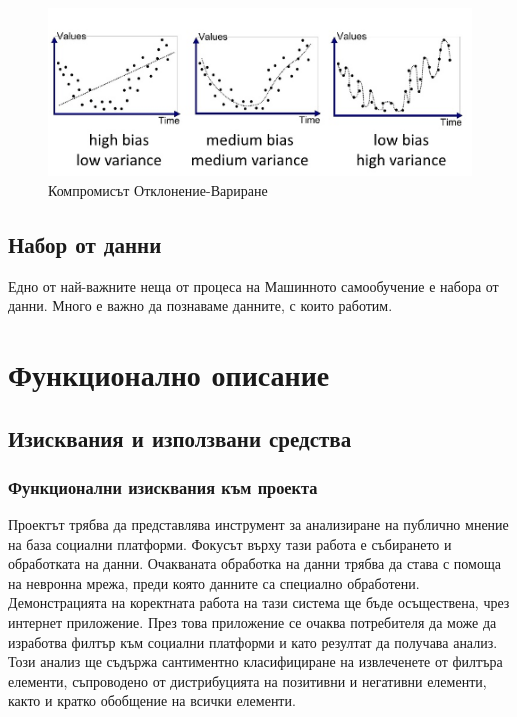 \documentclass{article}
\begin{document}
    \begin{figure}[H]
        \centering
        \captionsetup{justification=centering}
        \includegraphics[width=450px, keepaspectratio]{chapter-03/bias-variance.png}
        \caption{Компромисът Отклонение-Вариране}
    \end{figure}

    \subsection{Набор от данни}

    Едно от най-важните неща от процеса на Машинното самообучение е набора от данни. Много е важно да познаваме данните, с
    които работим. \cite{intro-to-ml}

    \newpage


    \section{Функционално описание}

    \subsection{Изисквания и използвани средства}

    \subsubsection{Функционални изисквания към проекта}

    Проектът трябва да представлява инструмент за анализиране на публично мнение на база социални платформи. Фокусът върху
    тази работа е събирането и обработката на данни. Очакваната обработка на данни трябва да става с помоща на невронна
    мрежа, преди която данните са специално обработени. Демонстрацията на коректната работа на тази система ще бъде
    осъществена, чрез интернет приложение. През това приложение се очаква потребителя да може да изработва филтър към
    социални платформи и като резултат да получава анализ. Този анализ ще съдържа сантиментно класифициране на извлеченете
    от филтъра елементи, съпроводено от дистрибуцията на позитивни и негативни елементи, както и кратко обобщение на всички
    елементи.
\end{document}

